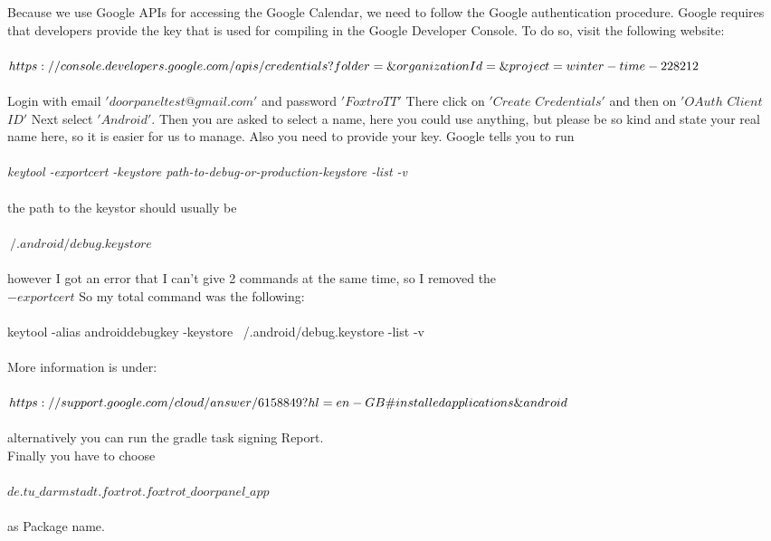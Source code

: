 \documentclass[article,colorback,accentcolor=tud4c, 11pt]{tudreport}
\begin{document}
Because we use Google APIs for accessing the Google Calendar, we need to follow the Google authentication procedure.
Google requires that developers provide the key that is used for compiling in the Google Developer Console.
To do so, visit the following website:\\ \\
$https://console.developers.google.com/apis/credentials?folder\\=\&organizationId=\&project=winter-time-228212$ \\ \\
Login with email $'doorpaneltest@gmail.com'$ and password $'FoxtroTT'$
There click on $'Create$ $Credentials'$ and then on $'OAuth$ $Client$ $ID'$ Next select $'Android'$.
Then you are asked to select a name, here you could use anything, but please be so kind and state your real name here, so it is easier for us to manage.
Also you need to provide your key. Google tells you to run\\ \\
\textit{keytool -exportcert -keystore path-to-debug-or-production-keystore -list -v} \\ \\
the path to the keystor should usually be\\ \\ $~/.android/debug.keystore$ \\ \\
however I got an error that I can't give 2 commands at the same time, so I removed the \\$-exportcert$
So my total command was the following:\\ \\
keytool -alias androiddebugkey -keystore ~/.android/debug.keystore -list -v\\ \\
More information is under:\\ \\
$https://support.google.com/cloud/answer/6158849?hl=en-GB\#\\installedapplications\&android$\\ \\
alternatively you can run the gradle task signing Report. \\
Finally you have to choose\\ \\$de.tu\_darmstadt.foxtrot.foxtrot\_doorpanel\_app$\\ \\ as Package name.	
\end{document}
